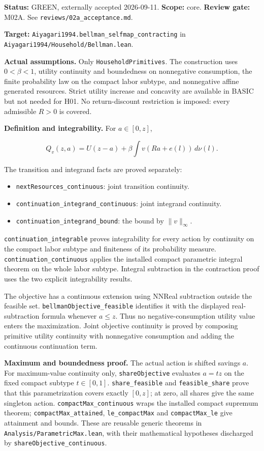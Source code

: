 \documentclass[
  11pt,
]{article}
\providecommand{\tightlist}{%
  \setlength{\itemsep}{0pt}\setlength{\parskip}{0pt}}
\let\LedgerOriginalTexttt\texttt
\renewcommand{\texttt}[1]{{\small\LedgerOriginalTexttt{#1}}}
\begin{document}
\textbf{Status:} GREEN, externally accepted 2026-09-11. \textbf{Scope:}
core. \textbf{Review gate:} M02A. See
\texttt{reviews/02a\_acceptance.md}.

\textbf{Target:} \texttt{Aiyagari1994.bellman\_selfmap\_contracting} in
\texttt{Aiyagari1994/Household/Bellman.lean}.

\textbf{Actual assumptions.} Only \texttt{HouseholdPrimitives}. The
construction uses \(0<\beta<1\), utility continuity and boundedness on
nonnegative consumption, the finite probability law on the compact labor
subtype, and nonnegative affine generated resources. Strict utility
increase and concavity are available in BASIC but not needed for H01. No
return-discount restriction is imposed: every admissible \(R>0\) is
covered.

\textbf{Definition and integrability.} For \(a\in[0,z]\),

\[Q_v(z,a)=U(z-a)+\beta\int v(Ra+e(l))\,d\nu(l).\]

The transition and integrand facts are proved separately:

\begin{itemize}
\tightlist
\item
  \texttt{nextResources\_continuous}: joint transition continuity.
\item
  \texttt{continuation\_integrand\_continuous}: joint integrand
  continuity.
\item
  \texttt{continuation\_integrand\_bound}: the bound by
  \(\|v\|_\infty\).
\end{itemize}

\texttt{continuation\_integrable} proves integrability for every action
by continuity on the compact labor subtype and finiteness of its
probability measure. \texttt{continuation\_continuous} applies the
installed compact parametric integral theorem on the whole labor
subtype. Integral subtraction in the contraction proof uses the two
explicit integrability results.

The objective has a continuous extension using NNReal subtraction
outside the feasible set. \texttt{bellmanObjective\_feasible} identifies
it with the displayed real-subtraction formula whenever \(a\leq z\).
Thus no negative-consumption utility value enters the maximization.
Joint objective continuity is proved by composing primitive utility
continuity with nonnegative consumption and adding the continuous
continuation term.

\textbf{Maximum and boundedness proof.} The actual action is shifted
savings \(a\). For maximum-value continuity only,
\texttt{shareObjective} evaluates \(a=tz\) on the fixed compact subtype
\(t\in[0,1]\). \texttt{share\_feasible} and \texttt{feasible\_share}
prove that this parametrization covers exactly \([0,z]\); at zero, all
shares give the same singleton action. \texttt{compactMax\_continuous}
wraps the installed compact supremum theorem;
\texttt{compactMax\_attained}, \texttt{le\_compactMax} and
\texttt{compactMax\_le} give attainment and bounds. These are reusable
generic theorems in \texttt{Analysis/ParametricMax.lean}, with their
mathematical hypotheses discharged by
\texttt{shareObjective\_continuous}.
\end{document}
